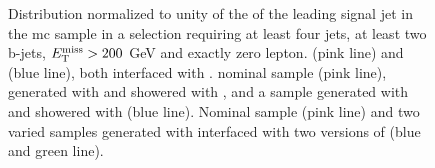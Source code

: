 \begin{figure}[htb]
\centering 
{}
\caption{Distribution normalized to unity of the \pt of the leading signal jet in the \ttbar \gls{mc} sample in a selection requiring at least four jets, at least two b-jets, $E_{\rm T}^{\mathrm{miss}}>200$ GeV and exactly zero lepton. 
 \PowhegBox (pink line) and \aNLO (blue line), both interfaced with \HWpp.
 nominal sample (pink line), generated with \PowhegBox and showered with \PY, and a sample generated with \PowhegBox and showered with \HWpp (blue line).
 Nominal sample (pink line) and two varied samples generated with \PowhegBox interfaced with two versions of \PY (blue and green line).}\label{fig:ttbar_ptj1_0L_syst}
\end{figure}


